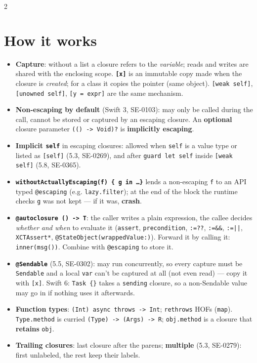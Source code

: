 \documentclass[8pt]{extarticle}
\makeatletter
\DeclareRobustCommand\op[1]{\texttt{\@tfor\@c:=#1\do{\hbox{\@c}}}}
\makeatother
\begin{document}
\begin{multicols}{2}
\raggedright

\section{How it works}
\begin{itemize}
  \item \textbf{Capture}: without a list a closure refers to the \emph{variable}; reads and
        writes are shared with the enclosing scope. \textbf{\texttt{[x]}} is an immutable copy made
        when the closure is \emph{created}; for a class it copies the pointer (same object).
        \texttt{[weak self]}, \texttt{[unowned self]}, \texttt{[y = expr]} are the same mechanism.
  \item \textbf{Non-escaping by default} (Swift 3, SE-0103): may only be called during the call,
        cannot be stored or captured by an escaping closure. An \textbf{optional} closure
        parameter \texttt{(() -> Void)?} is \textbf{implicitly escaping}.
  \item \textbf{Implicit \texttt{self}} in escaping closures: allowed when \texttt{self} is a value
        type or listed as \texttt{[self]} (5.3, SE-0269), and after
        \texttt{guard let self} inside \texttt{[weak self]} (5.8, SE-0365).
  \item \textbf{\texttt{withoutActuallyEscaping(f) \{ g in \ldots \}}} lends a non-escaping
        \texttt{f} to an API typed \texttt{@escaping} (e.g. \texttt{lazy.filter}); at the end of the
        block the runtime checks \texttt{g} was not kept — if it was, \textbf{crash}.
  \item \textbf{\texttt{@autoclosure () -> T}}: the caller writes a plain expression, the callee
        decides \emph{whether and when} to evaluate it (\texttt{assert}, \texttt{precondition},
        \op{??}, \op{\&\&}, \op{||}, \texttt{XCTAssert*}, \texttt{@StateObject(wrappedValue:)}).
        Forward it by calling it: \texttt{inner(msg())}. Combine with \texttt{@escaping} to store it.
  \item \textbf{\texttt{@Sendable}} (5.5, SE-0302): may run concurrently, so every capture must
        be \texttt{Sendable} and a local \texttt{var} can't be captured at all (not even read) —
        copy it with \texttt{[x]}. Swift 6: \texttt{Task \{\}} takes a \texttt{sending} closure, so a
        non-Sendable value may go in if nothing uses it afterwards.
  \item \textbf{Function types}: \texttt{(Int) async throws -> Int}; \texttt{rethrows} HOFs
        (\texttt{map}). \texttt{Type.method} is curried \texttt{(Type) -> (Args) -> R};
        \texttt{obj.method} is a closure that \textbf{retains} \texttt{obj}.
  \item \textbf{Trailing closures}: last closure after the parens; \textbf{multiple} (5.3,
        SE-0279): first unlabeled, the rest keep their labels.
\end{itemize}


\end{multicols}
\end{document}
